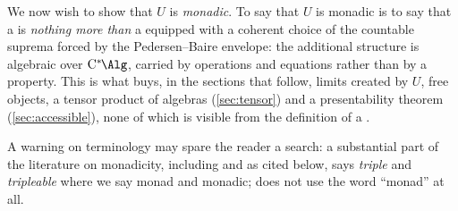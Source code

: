 We now wish to show that $U$ is \emph{monadic}. To say that $U$ is monadic is to say that a \cstars{} is \emph{nothing more than} a \cstar{} equipped with a coherent choice of the countable suprema forced by the Pedersen--Baire envelope: the additional structure is algebraic over $\Calg$, carried by operations and equations rather than by a property. This is what buys, in the sections that follow, limits created by $U$, free objects, a tensor product of algebras (\cref{sec:tensor}) and a presentability theorem (\cref{sec:accessible}), none of which is visible from the definition of a \cstars{}.

	A warning on terminology may spare the reader a search: a substantial part of the literature on monadicity, including \cite{barr2005toposes} and \cite{linton1969coequalizers} as cited below, says \emph{triple} and \emph{tripleable} where we say monad and monadic; \cite{barr2005toposes} does not use the word ``monad'' at all.
	
